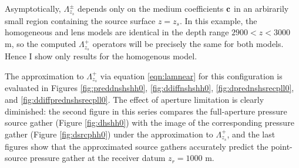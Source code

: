Asymptotically, $\Lambda^{\pm}_{z_s}$ depends only on the medium
coefficients ${\bf c}$ in an arbirarily small region containing the
source surface $z=z_s$. In this example, the homogeneous and lens models are identical in the depth
range $2900 < z < 3000$ m, so the computed $\Lambda^+_{z_s}$ operators
will be precisely the same for both models. Hence I show only results for the
homogenous model.

The approximation to $\Lambda_{z_s}^+$ via equation \ref{eqn:lamnear}
for this configuration is evaluated in
Figures \ref{fig:preddnshshh0}, \ref{fig:ddiffnshshh0},
\ref{fig:dprednshsrecpll0}, and \ref{fig:ddiffprednshsrecpll0}. The effect of aperture
limitation is clearly diminished: the second figure in this series
compares the full-aperture pressure source gather (Figure
\ref{fig:dhshh0}) with the 
image of the corresponding pressure gather (Figure \ref{fig:dsrcphh0})
under the approximation to $\Lambda_{z_s}^+$, and the last figures
show that the approximated source gathers accurately predict the
point-source pressure gather at the receiver datum $z_r=1000$ m.






